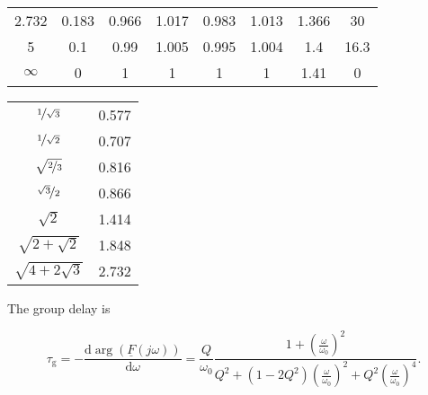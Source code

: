\documentclass{article}[11pt]
\begin{document}
\begin{table}[H]
\begin{tabular}{cccccccc}
2.732    & 0.183   & 0.966                                      & 1.017                                                                                            & 0.983                                      & 1.013                                                                                            & 1.366                                      & 30                                  \\
5        & 0.1     & 0.99                                       & 1.005                                                                                            & 0.995                                      & 1.004                                                                                            & 1.4                                        & 16.3                                \\
$\infty$ & 0       & 1                                          & 1                                                                                                & 1                                          & 1                                                                                                & 1.41                                       & 0                                   \\ \toprule
\end{tabular}
\label{tab:char-fs}
\end{table}

\begin{tabular}{cc}
\toprule
$\nicefrac{1}{\sqrt{3}}$ & 0.577 \\
$\nicefrac{1}{\sqrt{2}}$ & 0.707 \\
$\sqrt{\nicefrac{2}{3}}$ & 0.816 \\
$\nicefrac{\sqrt{3}}{2}$ & 0.866 \\
$\sqrt{2}$               & 1.414 \\
$\sqrt{2+\sqrt{2}}$      & 1.848 \\
$\sqrt{4+2\sqrt{3}}$     & 2.732 \\ \toprule
\end{tabular}


The group delay is

\begin{equation}
\tau_{\mathrm{g}} = -\frac{\mathrm{d} \arg\left(\underline{F}(j\omega)\right)}{\mathrm{d}\omega}
                  = \frac{Q}{\omega_0} \frac{1+\left(\frac{\omega}{\omega_0}\right)^2}{Q^2 + \left(1-2Q^2\right) \left(\frac{\omega}{\omega_0}\right)^2 + Q^2 \left(\frac{\omega}{\omega_0}\right)^4}.
\end{equation}
\end{document}
